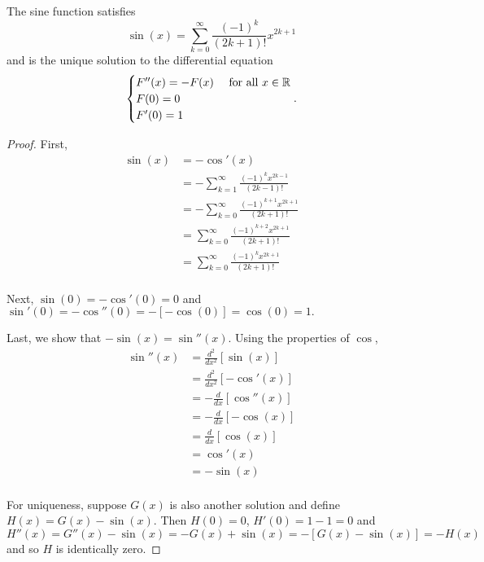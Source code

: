 \documentclass[letterpaper, twoside, 12pt]{book}
\begin{document}
\begin{theorem}
  The sine function satisfies
  \[
    \sin(x)
      =
    \sum_{k=0}^\infty
    \frac{(-1)^k}{(2k+1)!}x^{2k+1}
  \]
  and is the unique solution to the differential equation
  \[
    \begin{cases}
      F''(x)=-F(x) & \text{ for all } x\in \mathbb R \\
      F(0)=0 \\
      F'(0)=1
    \end{cases}
  .\]
\end{theorem}

\begin{proof}
    First,
    \begin{align*} 
        \sin(x) &= - \cos'(x) \\
                &= - \sum_{k=1}^{\infty} \frac{(-1)^k x^{2k - 1}}{(2k - 1)!} \\
                &= - \sum_{k=0}^{\infty} \frac{(-1)^{k + 1} x^{2k + 1}}{(2k + 1)!} \\ 
                &= \sum_{k=0}^{\infty} \frac{(-1)^{k + 2} x^{2k + 1}}{(2k + 1)!} \\ 
                &= \sum_{k=0}^{\infty} \frac{(-1)^k x^{2k + 1}}{(2k + 1)!} \\
    \end{align*}

    Next, \(\sin(0) = -\cos'(0) = 0\) and \(\sin'(0) = -\cos''(0) = -[-\cos(0)] = \cos(0) = 1 .\) 

    Last, we show that \(-\sin(x) = \sin''(x)\). Using the properties of \(\cos\), 
    \begin{align*} 
        \sin''(x) &= \frac{d^2}{dx^2}[ \sin(x) ] \\
                  &= \frac{d^2}{dx^2}[- \cos'(x)] \\
                  &= -\frac{d}{dx} [\cos''(x)] \\
                  &= - \frac{d}{dx} [- \cos(x)] \\
                  &= \frac{d}{dx} [ \cos(x) ] \\
                  &= \cos'(x) \\
                  &= - \sin(x) \\
    \end{align*}

    For uniqueness, suppose \(G(x)\) is also another solution and define \(H(x) = G(x) - \sin(x)\).
    Then \(H(0) = 0\), \(H'(0) = 1 - 1  = 0\) and 
    \[ H''(x) = G''(x) - \sin(x) = -G(x) + \sin(x) = -[G(x) - \sin(x)] = -H(x) \]
    and so \(H\) is identically zero. 
\end{proof}
\end{document}
